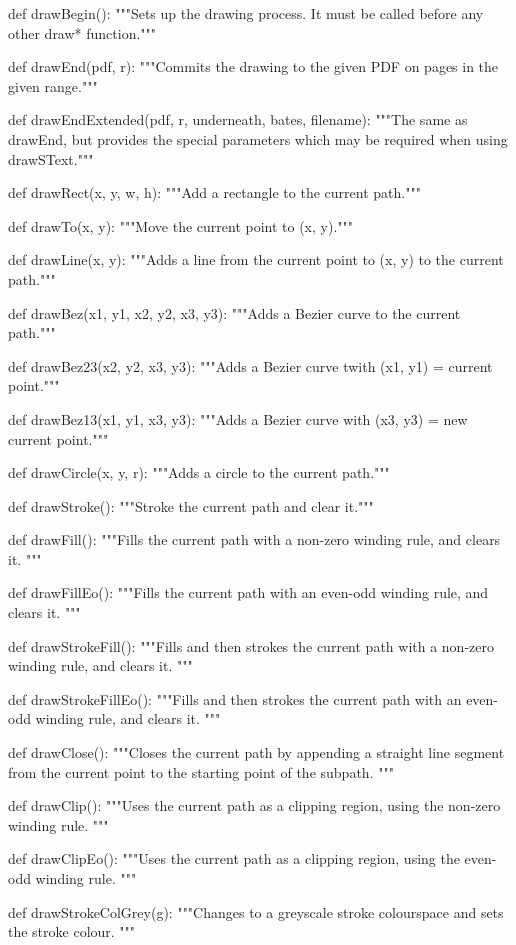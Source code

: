 def drawBegin():
    """Sets up the drawing process. It must be called before any other draw*
    function."""

def drawEnd(pdf, r):
    """Commits the drawing to the given PDF on pages in the given range."""

def drawEndExtended(pdf, r, underneath, bates, filename):
    """The same as drawEnd, but provides the special parameters which may be
    required when using drawSText."""

def drawRect(x, y, w, h):
    """Add a rectangle to the current path."""

def drawTo(x, y):
    """Move the current point to (x, y)."""

def drawLine(x, y):
    """Adds a line from the current point to (x, y) to the current path."""

def drawBez(x1, y1, x2, y2, x3, y3):
    """Adds a Bezier curve to the current path."""

def drawBez23(x2, y2, x3, y3):
    """Adds a Bezier curve twith (x1, y1) = current point."""

def drawBez13(x1, y1, x3, y3):
    """Adds a Bezier curve with (x3, y3) = new current point."""

def drawCircle(x, y, r):
    """Adds a circle to the current path."""

def drawStroke():
    """Stroke the current path and clear it."""

def drawFill():
    """Fills the current path with a non-zero winding rule, and clears it. """

def drawFillEo():
    """Fills the current path with an even-odd winding rule, and clears it. """

def drawStrokeFill():
    """Fills and then strokes the current path with a non-zero winding rule,
    and clears it. """

def drawStrokeFillEo():
    """Fills and then strokes the current path with an even-odd winding rule,
    and clears it. """

def drawClose():
    """Closes the current path by appending a straight line segment from the
    current point to the starting point of the subpath. """

def drawClip():
    """Uses the current path as a clipping region, using the non-zero winding
    rule. """

def drawClipEo():
    """Uses the current path as a clipping region, using the even-odd winding
    rule. """

def drawStrokeColGrey(g):
    """Changes to a greyscale stroke colourspace and sets the stroke colour.
    """

